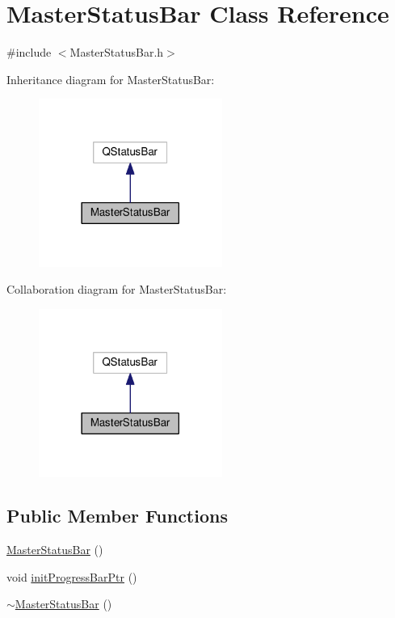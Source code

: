\hypertarget{class_master_status_bar}{\section{Master\-Status\-Bar Class Reference}
\label{class_master_status_bar}
}


{\ttfamily \#include $<$Master\-Status\-Bar.\-h$>$}



Inheritance diagram for Master\-Status\-Bar\-:\nopagebreak
\begin{figure}[H]
\begin{center}
\leavevmode
\includegraphics[width=170pt]{class_master_status_bar__inherit__graph}
\end{center}
\end{figure}


Collaboration diagram for Master\-Status\-Bar\-:\nopagebreak
\begin{figure}[H]
\begin{center}
\leavevmode
\includegraphics[width=170pt]{class_master_status_bar__coll__graph}
\end{center}
\end{figure}
\subsection*{Public Member Functions}
\begin{DoxyCompactItemize}
\item 
\hyperlink{class_master_status_bar_a773f6af002aeed9a3896bc89498ef66c}{Master\-Status\-Bar} ()
\item 
void \hyperlink{class_master_status_bar_aa5b964babad852afccb8654c4386cb31}{init\-Progress\-Bar\-Ptr} ()
\item 
\hyperlink{class_master_status_bar_ab6c1c48a1481006d73cf1c0de2eb4047}{$\sim$\-Master\-Status\-Bar} ()
\end{DoxyCompactItemize}
